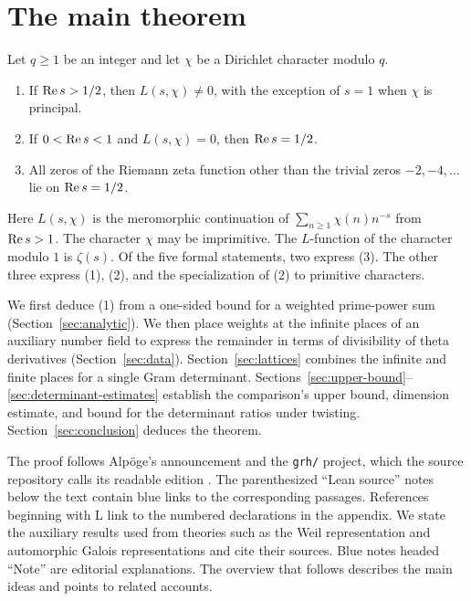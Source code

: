 \section{The main theorem}

\begin{theorem}\label{thm:grh}
Let \(q\ge1\) be an integer and let \(\chi\) be a Dirichlet character
modulo \(q\).
\begin{enumerate}
\item If \(\operatorname{Re} s>1/2\), then \(L(s,\chi)\ne0\), with the exception
      of \(s=1\) when \(\chi\) is principal.
\item If \(0<\operatorname{Re} s<1\) and \(L(s,\chi)=0\), then \(\operatorname{Re} s=1/2\).
\item All zeros of the Riemann zeta function other than the trivial
      zeros \(-2,-4,\ldots\) lie on \(\operatorname{Re} s=1/2\).
\end{enumerate}
\end{theorem}

\noindent
Here \(L(s,\chi)\) is the meromorphic continuation of
\(\sum_{n\ge1}\chi(n)n^{-s}\) from \(\operatorname{Re} s>1\).
The character \(\chi\) may be imprimitive.
The \(L\)-function of the character modulo \(1\) is \(\zeta(s)\).
Of the five formal statements, two express (3).
The other three express (1), (2), and the specialization of (2)
to primitive characters.

We first deduce (1) from a one-sided bound for a weighted prime-power sum
(Section~\ref{sec:analytic}). We then place weights at the infinite places
of an auxiliary number field to express the remainder in terms of
divisibility of theta derivatives (Section~\ref{sec:data}).
Section~\ref{sec:lattices} combines the infinite and finite places for
a single Gram determinant. Sections~\ref{sec:upper-bound}--\ref{sec:determinant-estimates}
establish the comparison's upper bound, dimension estimate, and bound
for the determinant ratios under twisting. Section~\ref{sec:conclusion}
deduces the theorem.

The proof follows Alpöge's announcement \cite{alpoege} and the
\texttt{grh/} project, which the source repository calls its readable
edition \cite{grh-source}.
The parenthesized “Lean source” notes below the text contain blue links
to the corresponding passages. References beginning with L link to the
numbered declarations in the appendix. We state the auxiliary results
used from theories such as the Weil representation and automorphic
Galois representations and cite their sources. Blue notes headed “Note”
are editorial explanations. The overview that follows describes the main ideas and
points to related accounts.
